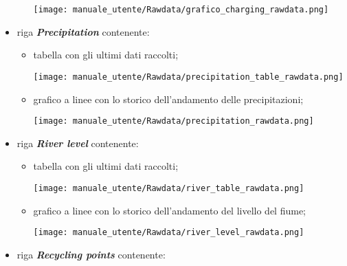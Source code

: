 \begin{itemize}
\begin{itemize}
        \begin{center}
            \texttt{[image: manuale\_utente/Rawdata/grafico\_charging\_rawdata.png]}
        \end{center}
    \end{itemize}
    \item riga \textit{\textbf{Precipitation}} contenente:
    \begin{itemize}
        \item tabella con gli ultimi dati raccolti;
        \begin{center}
            \texttt{[image: manuale\_utente/Rawdata/precipitation\_table\_rawdata.png]}
        \end{center}
        \item grafico a linee con lo storico dell'andamento delle precipitazioni;
        \begin{center}
            \texttt{[image: manuale\_utente/Rawdata/precipitation\_rawdata.png]}
        \end{center}
    \end{itemize}
    \item riga \textit{\textbf{River level}} contenente:
    \begin{itemize}
        \item tabella con gli ultimi dati raccolti;
        \begin{center}
            \texttt{[image: manuale\_utente/Rawdata/river\_table\_rawdata.png]}
        \end{center}
        \item grafico a linee con lo storico dell'andamento del livello del fiume;
        \begin{center}
            \texttt{[image: manuale\_utente/Rawdata/river\_level\_rawdata.png]}
        \end{center}
    \end{itemize}
    \item riga \textit{\textbf{Recycling points}} contenente:
    \begin{itemize}

\end{itemize}
\end{itemize}

